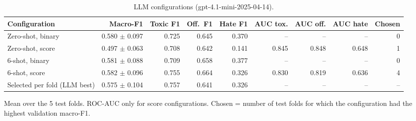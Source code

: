 \begin{table}[htbp]
\centering
\caption{LLM configurations (gpt-4.1-mini-2025-04-14).}
\label{tab:llm}
\begin{tabular}{lrrrrrrrr}
\toprule
Configuration & Macro-F1 & Toxic F1 & Off.\ F1 & Hate F1 & AUC tox. & AUC off. & AUC hate & Chosen \\
\midrule
Zero-shot, binary & 0.580 $\pm$ 0.097 & 0.725 & 0.645 & 0.370 & -- & -- & -- & 0 \\
Zero-shot, score & 0.497 $\pm$ 0.063 & 0.708 & 0.642 & 0.141 & 0.845 & 0.848 & 0.648 & 1 \\
6-shot, binary & 0.581 $\pm$ 0.088 & 0.709 & 0.658 & 0.377 & -- & -- & -- & 0 \\
6-shot, score & 0.582 $\pm$ 0.096 & 0.755 & 0.664 & 0.326 & 0.830 & 0.819 & 0.636 & 4 \\
\midrule
Selected per fold (LLM best) & 0.575 $\pm$ 0.104 & 0.757 & 0.641 & 0.326 & -- & -- & -- & -- \\
\bottomrule
\end{tabular}
\par\smallskip\footnotesize Mean over the 5 test folds. ROC-AUC only for score configurations. Chosen = number of test folds for which the configuration had the highest validation macro-F1.
\end{table}
